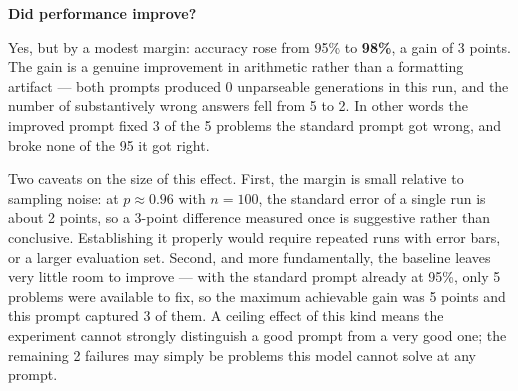 \begin{answer}
\textbf{Did performance improve?}

Yes, but by a modest margin: accuracy rose from 95\% to \textbf{98\%}, a gain of
3 points. The gain is a genuine improvement in arithmetic rather than a
formatting artifact --- both prompts produced 0 unparseable generations in this
run, and the number of substantively wrong answers fell from 5 to 2. In other
words the improved prompt fixed 3 of the 5 problems the standard prompt got
wrong, and broke none of the 95 it got right.

Two caveats on the size of this effect. First, the margin is small relative to
sampling noise: at $p \approx 0.96$ with $n = 100$, the standard error of a
single run is about 2 points, so a 3-point difference measured once is
suggestive rather than conclusive. Establishing it properly would require
repeated runs with error bars, or a larger evaluation set. Second, and more
fundamentally, the baseline leaves very little room to improve --- with the
standard prompt already at 95\%, only 5 problems were available to fix, so the
maximum achievable gain was 5 points and this prompt captured 3 of them. A
ceiling effect of this kind means the experiment cannot strongly distinguish a
good prompt from a very good one; the remaining 2 failures may simply be
problems this model cannot solve at any prompt.

\end{answer}

